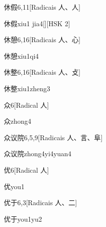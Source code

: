 \begin{entry}{休假}{6,11}[Radicais ⼈、⼈]
  \begin{phonetics}{休假}{xiu1 jia4}[][HSK 2]
  \end{phonetics}
\end{entry}

\begin{entry}{休憩}{6,16}[Radicais ⼈、⼼]
  \begin{phonetics}{休憩}{xiu1qi4}
  \end{phonetics}
\end{entry}

\begin{entry}{休整}{6,16}[Radicais ⼈、⽁]
  \begin{phonetics}{休整}{xiu1zheng3}
  \end{phonetics}
\end{entry}

\begin{entry}{众}{6}[Radical ⼈]
  \begin{phonetics}{众}{zhong4}
  \end{phonetics}
\end{entry}

\begin{entry}{众议院}{6,5,9}[Radicais ⼈、⾔、⾩]
  \begin{phonetics}{众议院}{zhong4yi4yuan4}
  \end{phonetics}
\end{entry}

\begin{entry}{优}{6}[Radical ⼈]
  \begin{phonetics}{优}{you1}
  \end{phonetics}
\end{entry}

\begin{entry}{优于}{6,3}[Radicais ⼈、⼆]
  \begin{phonetics}{优于}{you1yu2}
  \end{phonetics}
\end{entry}

